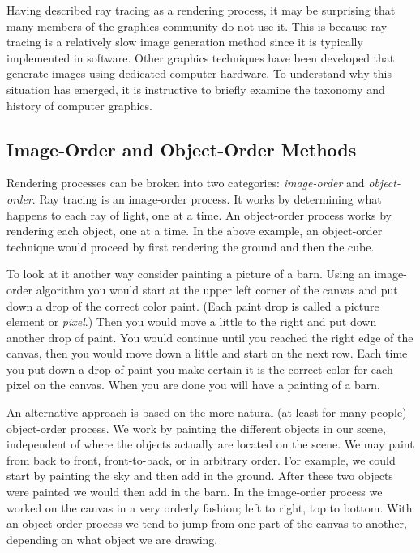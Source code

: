 Having described ray tracing as a rendering process, it may be surprising that many members of the graphics community do not use it. This is because ray tracing is a relatively slow image generation method since it is typically implemented in software. Other graphics techniques have been developed that generate images using dedicated computer hardware. To understand why this situation has emerged, it is instructive to briefly examine the taxonomy and history of computer graphics.

\subsection{Image-Order and Object-Order Methods}

Rendering processes can be broken into two categories: \emph{image-order} and \emph{object-order}. Ray tracing is an image-order process. It works by determining what happens to each ray of light, one at a time. An object-order process works by rendering each object, one at a time. In the above example, an object-order technique would proceed by first rendering the ground and then the cube.

To look at it another way consider painting a picture of a barn. Using an image-order algorithm you would start at the upper left corner of the canvas and put down a drop of the correct color paint. (Each paint drop is called a picture element or \emph{pixel}.) Then you would move a little to the right and put down another drop of paint. You would continue until you reached the right edge of the canvas, then you would move down a little and start on the next row. Each time you put down a drop of paint you make certain it is the correct color for each pixel on the canvas. When you are done you will have a painting of a barn.

An alternative approach is based on the more natural (at least for many people) object-order process. We work by painting the different objects in our scene, independent of where the objects actually are located on the scene. We may paint from back to front, front-to-back, or in arbitrary order. For example, we could start by painting the sky and then add in the ground. After these two objects were painted we would then add in the barn. In the image-order process we worked on the canvas in a very orderly fashion; left to right, top to bottom. With an object-order process we tend to jump from one part of the canvas to another, depending on what object we are drawing.

